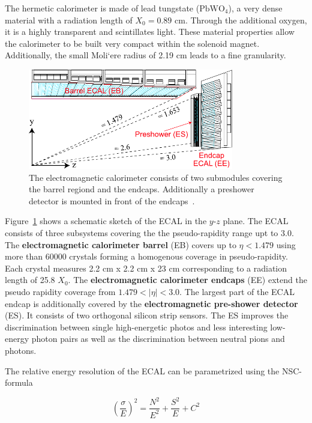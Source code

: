The hermetic calorimeter is made of lead tungstate ($\mathrm{PbWO}_4$), a very
dense material with a radiation length of $X_0 = 0.89$ cm. Through the
additional oxygen, it is a highly transparent and scintillates light. These
material properties allow the calorimeter to be built very compact within the
solenoid magnet. Additionally, the small Moli`ere  radius of 2.19 cm leads to a
fine granularity. 

\begin{figure}[htb]
    \centering
    \includegraphics[width=0.8\textwidth]{figures/cms_detector/cms_ecal.pdf}\hfill
    \caption[Electromagnetic Calorimeter]{The electromagnetic calorimeter
    consists of two submodules covering the barrel regiond and the endcaps.
    Additionally a preshower detector is mounted in front of the
    endcaps~\cite{cms:ecal}.}
    \label{fig:cms:ecal}
\end{figure}

Figure~\ref{fig:cms:ecal} shows a schematic sketch of the ECAL in the $y$-$z$
plane. The ECAL consists of three subsystems covering the the pseudo-rapidity
range upt to 3.0. The \textbf{electromagnetic calorimeter barrel} (EB) covers up
to $\eta < 1.479$ using more than 60000 crystals forming a homogenous coverage
in pseudo-rapidity. Each crystal measures 2.2 cm x 2.2 cm x 23 cm corresponding
to a radiation length of 25.8 $X_0$. The \textbf{electromagnetic calorimeter
endcaps} (EE) extend the pseudo rapidity coverage from $1.479 < |\eta| < 3.0$. The
largest part of the ECAL endcap is additionally covered by the
\textbf{electromagnetic pre-shower detector} (ES). It consists of two
orthogonal silicon strip sensors. The ES improves the discrimination between single
high-energetic photos and less interesting low-energy photon pairs as well as
the discrimination between neutral pions and photons.

The relative energy resolution of the ECAL can be parametrized using the NSC-formula

\begin{equation}
    \left( \frac{\sigma}{E} \right)^2 = \frac{N^2}{E^2} + \frac{S^2}{E} + C^2
\end{equation}

